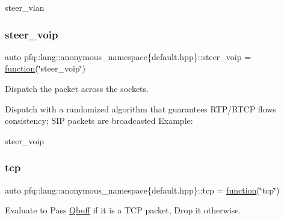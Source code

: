 steer\+\_\+vlan \mbox{\label{namespacepfq_1_1lang_1_1anonymous__namespace_02default_8hpp_03_a50fa612c45aa8f8dfd3259e2d0cbfce0}} 
\subsubsection{\texorpdfstring{steer\+\_\+voip}{steer\_voip}}
{\footnotesize\ttfamily auto pfq\+::lang\+::anonymous\+\_\+namespace\{default.\+hpp\}\+::steer\+\_\+voip = \hyperlink{namespacepfq_1_1lang_a1a4638059d700ae08d0ca63886ff2bb3}{function}(\char`\"{}steer\+\_\+voip\char`\"{})}



Dispatch the packet across the sockets. 

Dispatch with a randomized algorithm that guarantees R\+T\+P/\+R\+T\+CP flows consistency; S\+IP packets are broadcasted Example\+:

steer\+\_\+voip \mbox{\label{namespacepfq_1_1lang_1_1anonymous__namespace_02default_8hpp_03_a5b8ca91a33a120e7e0807e63c8b51b28}} 
\subsubsection{\texorpdfstring{tcp}{tcp}}
{\footnotesize\ttfamily auto pfq\+::lang\+::anonymous\+\_\+namespace\{default.\+hpp\}\+::tcp = \hyperlink{namespacepfq_1_1lang_a1a4638059d700ae08d0ca63886ff2bb3}{function}(\char`\"{}tcp\char`\"{})}



Evaluate to {\ttfamily Pass} \hyperlink{structpfq_1_1lang_1_1Qbuff}{Qbuff} if it is a T\+CP packet, {\ttfamily Drop} it otherwise. 

